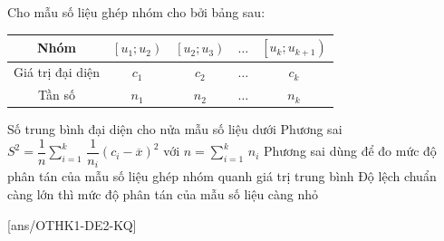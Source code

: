\begin{ex}%
	Cho mẫu số liệu ghép nhóm cho bởi bảng sau:
	\begin{center}
		\begin{tabular}{|c|c|c|c|c|}
			\hline Nhóm & $\left[u_1; u_2\right)$ & $\left[u_2; u_3\right)$ & $\ldots$ & $\left[u_k; u_{k+1}\right)$ \\
			\hline Giá trị đại diện& $c_1$ & $c_2$ & $\ldots$ & $c_k$ \\
			\hline Tần số & $n_1$ & $n_2$ & $\ldots$ & $n_k$ \\
			\hline
		\end{tabular}
	\end{center}
	\choiceTF
	{Số trung bình đại diện cho nửa mẫu số liệu dưới}
	{\True Phương sai $S^2=\dfrac{1}{n}\sum\limits_{i=1}^k\, \dfrac{1}{n_i}\left(c_i-\overline{x}\right)^2$ với $n=\sum\limits_{i=1}^k\, n_i$}
	{\True Phương sai dùng để đo mức độ phân tán của mẫu số liệu ghép nhóm quanh giá trị trung bình}
	{Độ lệch chuẩn càng lớn thì mức độ phân tán của mẫu số liệu càng nhỏ}
\end{ex}
[ans/OTHK1-DE2-KQ]
\caukq
